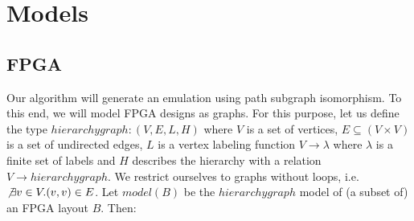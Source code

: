 \section{Models}
\subsection{FPGA}
Our algorithm will generate an emulation using path subgraph isomorphism. To this end, we will model FPGA designs as graphs. For this purpose, let us define the type $hierarchygraph : (V, E, L, H)$ where $V$ is a set of vertices, $E\subseteq (V \times V)$ is a set of undirected edges, $L$ is a vertex labeling function $V \to \lambda$ where $\lambda$ is a finite set of labels and $H$ describes the hierarchy with a relation $V \to hierarchygraph$. We restrict ourselves to graphs without loops, i.e. $\not \exists v \in V . (v, v) \in E$. Let $model(B)$ be the $hierarchygraph$ model of (a subset of) an FPGA layout $B$. Then:


